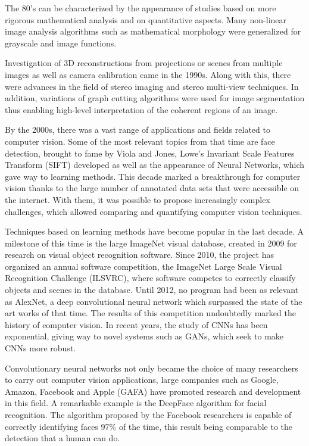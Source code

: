 The 80's can be characterized by the appearance of studies based on more rigorous mathematical analysis and on quantitative aspects. Many non-linear image analysis algorithms such as mathematical morphology were generalized for grayscale and image functions.

Investigation of 3D reconstructions from projections or scenes from multiple images as well as camera calibration came in the 1990s. Along with this, there were advances in the field of stereo imaging and stereo multi-view techniques. In addition, variations of graph cutting algorithms were used for image segmentation thus enabling high-level interpretation of the coherent regions of an image.

By the 2000s, there was a vast range of applications and fields related to computer vision. Some of the most relevant topics from that time are face detection, brought to fame by Viola and Jones, Lowe's Invariant Scale Features Transform (SIFT) developed as well as the appearance of Neural Networks, which gave way to learning methods. This decade marked a breakthrough for computer vision thanks to the large number of annotated data sets that were accessible on the internet. With them, it was possible to propose increasingly complex challenges, which allowed comparing and quantifying computer vision techniques.

Techniques based on learning methods have become popular in the last decade. A milestone of this time is the large ImageNet visual database, created in 2009 for research on visual object recognition software. Since 2010, the project has organized an annual software competition, the ImageNet Large Scale Visual Recognition Challenge (ILSVRC), where software competes to correctly classify objects and scenes in the database. Until 2012, no program had been as relevant as AlexNet, a deep convolutional neural network which surpassed the state of the art works of that time. The results of this competition undoubtedly marked the history of computer vision. In recent years, the study of CNNs has been exponential, giving way to novel systems such as GANs, which seek to make CNNs more robust.

Convolutionary neural networks not only became the choice of many researchers to carry out computer vision applications, large companies such as Google, Amazon, Facebook and Apple (GAFA) have promoted research and development in this field. A remarkable example is the DeepFace algorithm for facial recognition. The algorithm proposed by the Facebook researchers is capable of correctly identifying faces 97$\%$ of the time, this result being comparable to the detection that a human can do.

